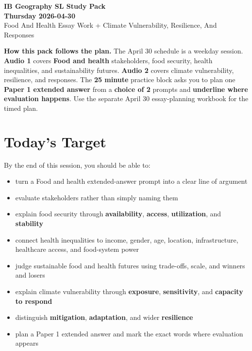 \documentclass[11pt,a4paper]{article}
\newcommand{\term}[1]{\textcolor{HeadingBlue}{\textbf{#1}}}
\newcommand{\boxnote}[3]{%
\noindent\colorbox{#1}{%
  \begin{minipage}{0.965\textwidth}
  \sffamily
  \textbf{\textcolor{HeadingBlue}{#2}} #3
  \end{minipage}
}}
\begin{document}
\begin{center}
  {\sffamily\bfseries\color{HeadingBlue}\LARGE IB Geography SL Study Pack}\\[0.25em]
  {\sffamily\bfseries\color{AccentTeal}\Large Thursday 2026-04-30}\\[0.35em]
  {\sffamily\color{TextInk}Food And Health Essay Work + Climate Vulnerability, Resilience, And Responses}
\end{center}

\vspace{0.5em}

\boxnote{SoftBlue}{How this pack follows the plan.}{The April 30 schedule is a
weekday session. \term{Audio 1} covers \term{Food and health} stakeholders,
food security, health inequalities, and sustainability futures. \term{Audio 2}
covers climate vulnerability, resilience, and responses. The \term{25 minute}
practice block asks you to plan one \term{Paper 1 extended answer} from a
\term{choice of 2} prompts and \term{underline where evaluation happens}. Use
the separate April 30 essay-planning workbook for the timed plan.}

\section{Today's Target}

By the end of this session, you should be able to:

\begin{itemize}
  \item turn a Food and health extended-answer prompt into a clear line of argument
  \item evaluate stakeholders rather than simply naming them
  \item explain food security through \term{availability}, \term{access},
  \term{utilization}, and \term{stability}
  \item connect health inequalities to income, gender, age, location,
  infrastructure, healthcare access, and food-system power
  \item judge sustainable food and health futures using trade-offs, scale, and
  winners and losers
  \item explain climate vulnerability through \term{exposure},
  \term{sensitivity}, and \term{capacity to respond}
  \item distinguish \term{mitigation}, \term{adaptation}, and wider
  \term{resilience}
  \item plan a Paper 1 extended answer and mark the exact words where
  evaluation appears
\end{itemize}
\end{document}
